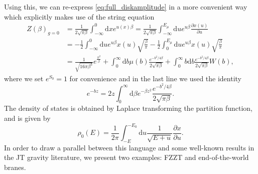 \documentclass[a4paper,11pt]{article}
\newcommand{\rmd}{\mathrm{d}}
\begin{document}
Using this, we can re-express \eqref{eq:full_diskamplitude} in a more convenient way which explicitly makes use of the string equation 
\cite{Johnson:2019eik,Okuyama:2019xbv,Turi:2020ale}
\begin{align}
 Z(\beta)_{g=0}&=\frac{1}{2\sqrt{\pi\beta}}\int_{-\infty}^0\rmd x e^{u(x) \beta }=
\frac{1}{2\sqrt{\pi\beta}}\int_{-\infty}^{E_\mu}\rmd u e^{u \beta }\frac{\partial x(u)}{\partial u}\label{eq:Z0def}\\
&=  -\frac{1}{2}\int_{-\infty}^0\rmd u e^{u \beta }x(u)\sqrt{\frac{\beta}{\pi}} -\frac{1}{2}\int_{0}^{E_\mu}\rmd u e^{u \beta }x(u)\sqrt{\frac{\beta}{\pi}}\\
&=  \frac{1}{\sqrt{16\pi\beta^3}}e^{\frac{\pi^2}{\beta}}+\int_0^\infty \rmd b\mu(b)\frac{e^{-b^2/4\beta}}{2\sqrt{\pi \beta}} + \int_0^\infty b\rmd b\frac{e^{-b^2/4\beta}}{2\sqrt{\pi \beta}}W(b),
\end{align}
where we set $e^{S_0}=1$ for convenience and in the last line we used the identity
\begin{equation}
    e^{-bz}=2z\int_0^\infty \rmd \beta e^{-\beta z^2}\frac{e^{-b^2/4\beta}}{2\sqrt{\pi \beta}}.
\end{equation}
The density of states is obtained by Laplace transforming the partition function, and is given by
\begin{equation}
        \rho_{0}(E) = \frac{1}{2\pi}\int_{-E}^{-E_0}\rmd u \frac{1}{\sqrt{E+u}} \frac{\partial x}{\partial u}\label{eq:rho0def}.
\end{equation}
In order to draw a parallel between this language and some well-known results in the JT gravity literature, we present two examples: FZZT and end-of-the-world branes.
\end{document}
